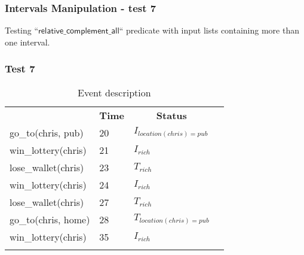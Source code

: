 \documentclass[8pt]{beamer}
\def \patsize {}
\def\complementall{\textsf{\patsize relative\_complement\_all}}
\begin{document}
\begin{frame}
    \frametitle{Intervals Manipulation - test 7}
    \small Testing ``$\complementall$`` predicate with input lists containing more than one interval.\linebreak
    \subsubsection{Test 7}
    \begin{minipage}{0.48\linewidth}
        \begin{table}[t!]
            \caption{Event description}
            \begin{center}

                \begin{tabular}{llll}
                    \hline\noalign{\smallskip}
                    \multicolumn{1}{l}{\textbf{Event}} & \multicolumn{1}{c}{\textbf{Time}} & \multicolumn{1}{c}{\textbf{Status}}  \\
                    go\_to(chris, pub)& 20 & $I_{location(chris)=pub}$\\
                    win\_lottery(chris)&21 &$I_{rich}$\\
                    lose\_wallet(chris)& 23 &$T_{rich}$\\
                    win\_lottery(chris)& 24 &$I_{rich}$\\
                    lose\_wallet(chris)& 27 &$T_{rich}$\\
                    go\_to(chris, home)& 28 &$T_{location(chris)=pub}$\\
                    win\_lottery(chris)& 35&$I_{rich}$\\
                    \noalign{\smallskip}
                    \hline
                \end{tabular}
            \end{center}
        \end{table}


\end{minipage}
\end{frame}
\end{document}
